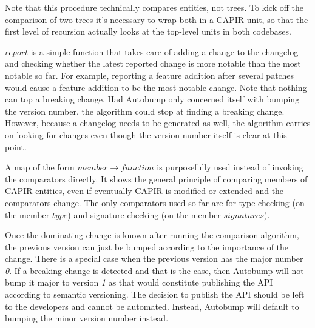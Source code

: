 \documentclass{l4proj}
\begin{document}
Note that this procedure technically compares entities, not trees. To
kick off the comparison of two trees it's necessary to wrap both in a
CAPIR unit, so that the first level of recursion actually looks at the
top-level units in both codebases.



$report$ is a simple function that takes care of adding a change to
the changelog and checking whether the latest reported change is more
notable than the most notable so far. For example, reporting a feature
addition after several patches would cause a feature addition to be
the most notable change. Note that nothing can top a breaking change.
Had Autobump only concerned itself with bumping the version number,
the algorithm could stop at finding a breaking change. However,
because a changelog needs to be generated as well, the algorithm
carries on looking for changes even though the version number itself
is clear at this point.

A map of the form $member \rightarrow function$ is purposefully used
instead of invoking the comparators directly. It shows the general
principle of comparing members of CAPIR entities, even if eventually
CAPIR is modified or extended and the comparators change. The only
comparators used so far are for type checking (on the member $type$)
and signature checking (on the member $signatures$).


Once the dominating change is known after running the comparison
algorithm, the previous version can just be bumped according to the
importance of the change. There is a special case when the previous
version has the major number \textit{0}. If a breaking change is
detected and that is the case, then Autobump will not bump it major to
version \textit{1} as that would constitute publishing the API
according to semantic versioning. The decision to publish the API
should be left to the developers and cannot be automated. Instead,
Autobump will default to bumping the minor version number instead.
\end{document}
